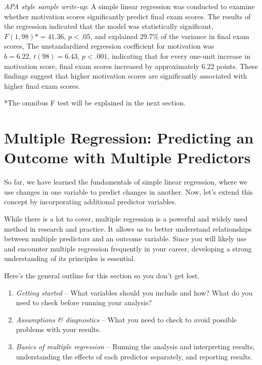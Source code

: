 \documentclass[
  letterpaper,
  DIV=11,
  numbers=noendperiod]{scrreprt}
\begin{document}
\emph{APA style sample write-up}: A simple linear regression was
conducted to examine whether motivation scores significantly predict
final exam scores. The results of the regression indicated that the
model was statistically significant, \(F(1, 98)* = 41.36, \, p < .05\),
and explained 29.7\% of the variance in final exam scores, The
unstandardized regression coefficient for motivation was
\(b = 6.22, \, t(98) = 6.43, \, p < .001\), indicating that for every
one-unit increase in motivation score, final exam scores increased by
approximately 6.22 points. These findings suggest that higher motivation
scores are significantly associated with higher final exam scores.

*The omnibus F test will be explained in the next section.

\section{Multiple Regression: Predicting an Outcome with Multiple
Predictors}\label{multiple-regression-predicting-an-outcome-with-multiple-predictors}

So far, we have learned the fundamentals of simple linear regression,
where we use changes in one variable to predict changes in another. Now,
let's extend this concept by incorporating additional predictor
variables.

While there is a lot to cover, multiple regression is a powerful and
widely used method in research and practice. It allows us to better
understand relationships between multiple predictors and an outcome
variable. Since you will likely use and encounter multiple regression
frequently in your career, developing a strong understanding of its
principles is essential.

Here's the general outline for this section so you don't get lost.\,\,

\begin{enumerate}
\def\labelenumi{\arabic{enumi}.}
\item
  \emph{Getting started} -- What variables should you include and how?
  What do you need to check before running your analysis?\,
\item
  \emph{Assumptions \& diagnostics} -- What you need to check to avoid
  possible problems with your results.
\item
  \emph{Basics of multiple regression} -- Running the analysis and
  interpreting results, understanding the effects of each predictor
  separately, and reporting results.\,
\end{enumerate}
\end{document}
